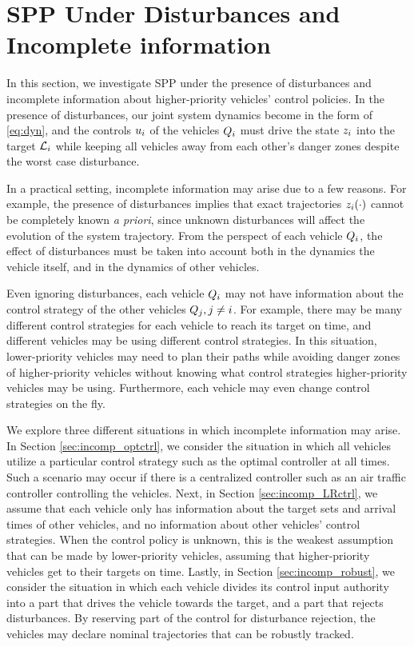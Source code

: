 \section{SPP Under Disturbances and Incomplete information \label{sec:incomp}}
In this section, we investigate SPP under the presence of disturbances and incomplete information about higher-priority vehicles' control policies. In the presence of disturbances, our joint system dynamics become in the form of \eqref{eq:dyn}, and the controls $u_i$ of the vehicles $Q_{i}$ must drive the state $z_i$ into the target $\mathcal{L}_i$ while keeping all vehicles away from each other's danger zones despite the worst case disturbance.

In a practical setting, incomplete information may arise due to a few reasons. For example, the presence of disturbances implies that exact trajectories $z_i(\cdot)$ cannot be completely known \textit{a priori}, since unknown disturbances will affect the evolution of the system trajectory. From the perspect of each vehicle $Q_{i}$, the effect of disturbances must be taken into account both in the dynamics the vehicle itself, and in the dynamics of other vehicles.

Even ignoring disturbances, each vehicle $Q_{i}$ may not have information about the control strategy of the other vehicles $Q_{j}, j\neq i$. For example, there may be many different control strategies for each vehicle to reach its target on time, and different vehicles may be using different control strategies. In this situation, lower-priority vehicles may need to plan their paths while avoiding danger zones of higher-priority vehicles without knowing what control strategies higher-priority vehicles may be using. Furthermore, each vehicle may even change control strategies on the fly.

We explore three different situations in which incomplete information may arise. In Section \ref{sec:incomp_optctrl}, we consider the situation in which all vehicles utilize a particular control strategy such as the optimal controller at all times. Such a scenario may occur if there is a centralized controller such as an air traffic controller controlling the vehicles. Next, in Section \ref{sec:incomp_LRctrl}, we assume that each vehicle only has information about the target sets and arrival times of other vehicles, and no information about other vehicles' control strategies. When the control policy is unknown, this is the weakest assumption that can be made by lower-priority vehicles, assuming that higher-priority vehicles get to their targets on time. Lastly, in Section \ref{sec:incomp_robust}, we consider the situation in which each vehicle divides its control input authority into a part that drives the vehicle towards the target, and a part that rejects disturbances. By reserving part of the control for disturbance rejection, the vehicles may declare nominal trajectories that can be robustly tracked.

